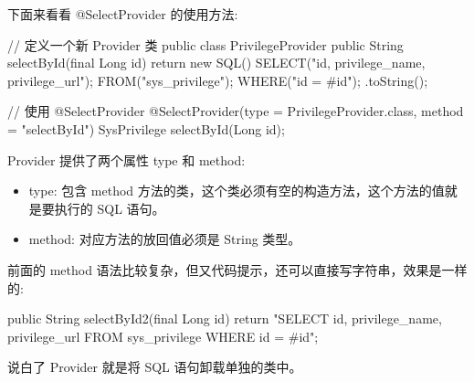 下面来看看 @SelectProvider 的使用方法:

\begin{Java}
// 定义一个新 Provider 类
public class PrivilegeProvider {
    public String selectById(final Long id) {
        return new SQL(){
            {
                SELECT("id, privilege_name, privilege_url");
                FROM("sys_privilege");
                WHERE("id = #{id}");
            }
        }.toString();
    }
}
\end{Java}

\begin{Java}
// 使用 @SelectProvider
@SelectProvider(type = PrivilegeProvider.class, method = "selectById")
SysPrivilege selectById(Long id);
\end{Java}

Provider 提供了两个属性 type 和 method:
\begin{itemize}
    \item type: 包含 method 方法的类，这个类必须有空的构造方法，这个方法的值就是要执行的 SQL 语句。
    \item method: 对应方法的放回值必须是 String 类型。
\end{itemize}

前面的 method 语法比较复杂，但又代码提示，还可以直接写字符串，效果是一样的:

\begin{Java}
public String selectById2(final Long id) {
    return "SELECT id, privilege_name, privilege_url FROM sys_privilege WHERE id = #{id}";
}
\end{Java}

说白了 Provider 就是将 SQL 语句卸载单独的类中。

\newpage